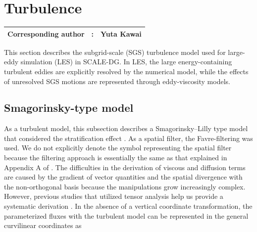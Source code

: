 \section{Turbulence}\label{sec:turbulence}
{\bf \Large
\begin{tabular}{ccc}
\hline
  Corresponding author & : & Yuta Kawai\\
\hline
\end{tabular}
}

This section describes the subgrid-scale (SGS) turbulence model used for large-eddy simulation (LES) in SCALE-DG. 
In LES, the large energy-containing turbulent eddies are explicitly resolved by the numerical model, 
while the effects of unresolved SGS motions are represented through eddy-viscosity models. 

\subsection{Smagorinsky-type model}\label{sec:turbulence_model_SMG}
As a turbulent model, 
this subsection describes 
a Smagorinsky--Lilly type model \citep{smagorinsky1963general,lilly1962numerical} 
that considered the stratification effect \citep{brown1994largeeddy}. 
As a spatial filter, 
the Favre-filtering \citep{favre1983turbulence} was used.  
We do not explicitly denote the symbol representing the spatial filter 
because the filtering approach is essentially the same as that explained in Appendix A of \cite{KT2023NumAccuracyDG}. 
The difficulties in the derivation of viscous and diffusion terms 
are caused by the gradient of vector quantities 
and the spatial divergence with the non-orthogonal basis
because the manipulations grow increasingly complex. 
However, 
previous studies that utilized tensor analysis help us provide a systematic derivation \citep[e.g.,][]{ullrich_global_2014,Rancic2017Nonhydro}. 
In the absence of a vertical coordinate transformation, 
the parameterized fluxes with the turbulent model can be represented in the general curvilinear coordinates as 
